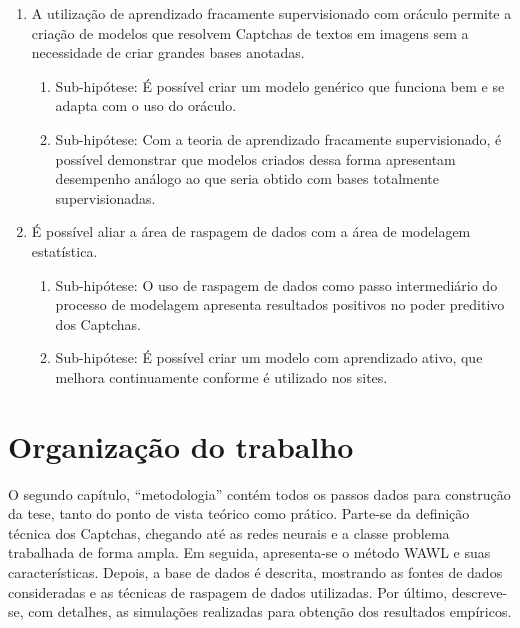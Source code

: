 \documentclass[12pt,twoside,brazilian]{book}
\providecommand{\tightlist}{%
  \setlength{\itemsep}{0pt}\setlength{\parskip}{0pt}}
\begin{document}
\begin{enumerate}
\def\labelenumi{\arabic{enumi}.}
\tightlist
\item
  A utilização de aprendizado fracamente supervisionado com oráculo
  permite a criação de modelos que resolvem Captchas de textos em
  imagens sem a necessidade de criar grandes bases anotadas.

  \begin{enumerate}
  \def\labelenumii{\alph{enumii}.}
  \tightlist
  \item
    Sub-hipótese: É possível criar um modelo genérico que funciona bem e
    se adapta com o uso do oráculo.
  \item
    Sub-hipótese: Com a teoria de aprendizado fracamente supervisionado,
    é possível demonstrar que modelos criados dessa forma apresentam
    desempenho análogo ao que seria obtido com bases totalmente
    supervisionadas.
  \end{enumerate}
\item
  É possível aliar a área de raspagem de dados com a área de modelagem
  estatística.

  \begin{enumerate}
  \def\labelenumii{\alph{enumii}.}
  \tightlist
  \item
    Sub-hipótese: O uso de raspagem de dados como passo intermediário do
    processo de modelagem apresenta resultados positivos no poder
    preditivo dos Captchas.
  \item
    Sub-hipótese: É possível criar um modelo com aprendizado ativo, que
    melhora continuamente conforme é utilizado nos sites.
  \end{enumerate}
\end{enumerate}

\hypertarget{organizauxe7uxe3o-do-trabalho}{%
\section{Organização do trabalho}\label{organizauxe7uxe3o-do-trabalho}}

O segundo capítulo, ``metodologia'' contém todos os passos dados para
construção da tese, tanto do ponto de vista teórico como prático.
Parte-se da definição técnica dos Captchas, chegando até as redes
neurais e a classe problema trabalhada de forma ampla. Em seguida,
apresenta-se o método WAWL e suas características. Depois, a base de
dados é descrita, mostrando as fontes de dados consideradas e as
técnicas de raspagem de dados utilizadas. Por último, descreve-se, com
detalhes, as simulações realizadas para obtenção dos resultados
empíricos.
\end{document}
